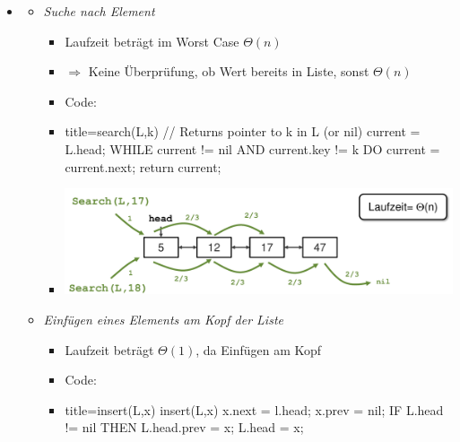 \documentclass[
    12pt,
    a4paper,
    ngerman,
    color=3b,%
    marginpar=false,
    colorback=false,
    leqno,
]{tudaexercise}
\begin{document}
\begin{itemize}
    \item {}
          \begin{itemize}
              \item \textit{Suche nach Element}
                    \begin{itemize}
                        \item Laufzeit beträgt im Worst Case $\Theta(n)$
                        \item[] $\Rightarrow$ Keine Überprüfung, ob Wert bereits in Liste, sonst $\Theta(n)$
                        \item Code:
                        \item[]
                              \begin{codeBlock}[autogobble]{title={search(L,k) // Returns pointer to k in L (or nil)}}
                                  current = L.head;
                                  WHILE current != nil AND current.key != k DO
                                    current = current.next;
                                  return current;
                              \end{codeBlock}
                        \item[] \includegraphics[width=12cm]{pictures/verketteteListenSuche.pdf}
                    \end{itemize}

                    \clearpage
              \item \textit{Einfügen eines Elements am Kopf der Liste}
                    \begin{itemize}
                        \item Laufzeit beträgt $\Theta(1)$, da Einfügen am Kopf
                        \item Code:
                        \item[]
                              \begin{codeBlock}[autogobble]{title={insert(L,x)}}
                                  insert(L,x)
                                  x.next = l.head;
                                  x.prev = nil;
                                  IF L.head != nil THEN
                                    L.head.prev = x;
                                  L.head = x;
                              \end{codeBlock}
                    \end{itemize}


\end{itemize}
\end{itemize}
\end{document}
